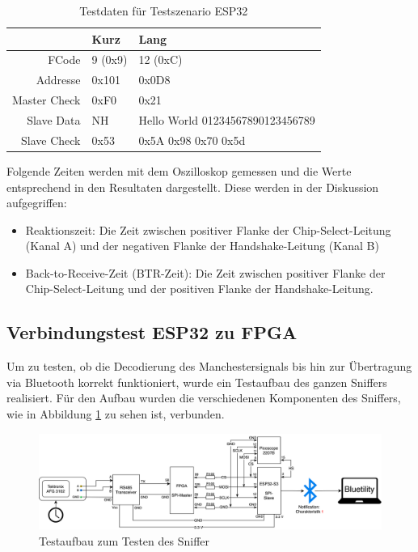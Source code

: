 \begin{table}[H]
    \centering
    \begin{tabular}{r||l|l}
         & Kurz & Lang\\ \hline
        FCode & 9 (0x9) & 12 (0xC)\\ \hline
        Addresse & 0x101 & 0x0D8\\ \hline
        Master Check & 0xF0 & 0x21\\ \hline
        Slave Data & NH & Hello World 01234567890123456789\\ \hline
        Slave Check & 0x53 & 0x5A 0x98 0x70 0x5d\\ 
    \end{tabular}
    \caption{Testdaten für Testszenario ESP32}
    \label{tab:TestDataESP32}
\end{table}

Folgende Zeiten werden mit dem Oszilloskop gemessen und die Werte entsprechend in den Resultaten dargestellt. Diese werden in der Diskussion aufgegriffen:
\begin{itemize}
    \item Reaktionszeit: Die Zeit zwischen positiver Flanke der Chip-Select-Leitung (Kanal A) und der negativen Flanke der Handshake-Leitung (Kanal B)
    \item Back-to-Receive-Zeit (BTR-Zeit): Die Zeit zwischen positiver Flanke der Chip-Select-Leitung und der positiven Flanke der Handshake-Leitung.
\end{itemize}

\subsection{Verbindungstest ESP32 zu FPGA}
\label{subsec:VerbindugstestESP32FPGA}

Um zu testen, ob die Decodierung des Manchestersignals bis hin zur Übertragung via Bluetooth korrekt funktioniert, wurde ein Testaufbau des ganzen Sniffers realisiert. Für den Aufbau wurden die verschiedenen Komponenten des Sniffers, wie in Abbildung \ref{fig:TestszenarioSniffer} zu sehen ist, verbunden.

\begin{figure}[H]
    \centering
    \includegraphics[width=1\linewidth]{Figures/Chap3/Testszenarien/Testszenario_Sniffer.png}
    \caption{Testaufbau zum Testen des Sniffer}
    \label{fig:TestszenarioSniffer}
\end{figure}



